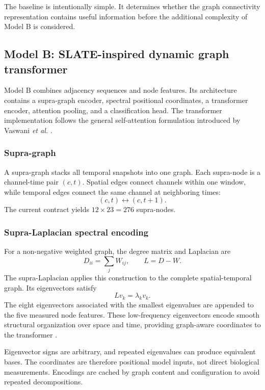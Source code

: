 \documentclass[conference]{IEEEtran}
\begin{document}
The baseline is intentionally simple. It determines whether the graph connectivity representation contains useful information before the additional complexity of Model B is considered.

\subsection{Model B: SLATE-inspired dynamic graph transformer}
Model B combines adjacency sequences and node features. Its architecture contains a supra-graph encoder, spectral positional coordinates, a transformer encoder, attention pooling, and a classification head. The transformer implementation follows the general self-attention formulation introduced by Vaswani \emph{et al.} \cite{vaswani2017attention}.

\subsubsection{Supra-graph}
A supra-graph stacks all temporal snapshots into one graph. Each supra-node is a channel-time pair $(c,t)$. Spatial edges connect channels within one window, while temporal edges connect the same channel at neighboring times:
\begin{equation}
 (c,t)\leftrightarrow(c,t+1).
\end{equation}
The current contract yields $12\times23=276$ supra-nodes.

\subsubsection{Supra-Laplacian spectral encoding}
For a non-negative weighted graph, the degree matrix and Laplacian are
\begin{equation}
 D_{ii}=\sum_j W_{ij}, \qquad L=D-W.
\end{equation}
The supra-Laplacian applies this construction to the complete spatial-temporal graph. Its eigenvectors satisfy
\begin{equation}
 L v_k = \lambda_k v_k.
\end{equation}
The eight eigenvectors associated with the smallest eigenvalues are appended to the five measured node features. These low-frequency eigenvectors encode smooth structural organization over space and time, providing graph-aware coordinates to the transformer \cite{chung1997spectral,karmim2024slate}.

Eigenvector signs are arbitrary, and repeated eigenvalues can produce equivalent bases. The coordinates are therefore positional model inputs, not direct biological measurements. Encodings are cached by graph content and configuration to avoid repeated decompositions.
\end{document}
